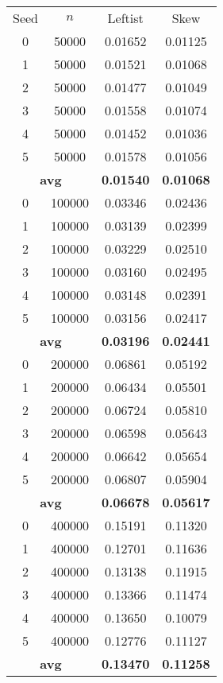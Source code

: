 \documentclass{article}
\begin{document}
\begin{minipage}{0.49\textwidth}
    \begin{center}
        \begin{tabular}{|cccc|}\hline
        Seed & $n$ & Leftist & Skew    \\
        0 &  50000 & 0.01652 & 0.01125 \\
        1 &  50000 & 0.01521 & 0.01068 \\
        2 &  50000 & 0.01477 & 0.01049 \\
        3 &  50000 & 0.01558 & 0.01074 \\
        4 &  50000 & 0.01452 & 0.01036 \\
        5 &  50000 & 0.01578 & 0.01056 \\
        \multicolumn{2}{|c}{\textbf{avg}} & \textbf{0.01540} & \textbf{0.01068} \\ \hline
        0 & 100000 & 0.03346 & 0.02436 \\
        1 & 100000 & 0.03139 & 0.02399 \\
        2 & 100000 & 0.03229 & 0.02510 \\
        3 & 100000 & 0.03160 & 0.02495 \\
        4 & 100000 & 0.03148 & 0.02391 \\
        5 & 100000 & 0.03156 & 0.02417 \\
        \multicolumn{2}{|c}{\textbf{avg}} & \textbf{0.03196} & \textbf{0.02441} \\ \hline
        0 & 200000 & 0.06861 & 0.05192 \\
        1 & 200000 & 0.06434 & 0.05501 \\
        2 & 200000 & 0.06724 & 0.05810 \\
        3 & 200000 & 0.06598 & 0.05643 \\
        4 & 200000 & 0.06642 & 0.05654 \\
        5 & 200000 & 0.06807 & 0.05904 \\
        \multicolumn{2}{|c}{\textbf{avg}} & \textbf{0.06678} & \textbf{0.05617} \\ \hline
        0 & 400000 & 0.15191 & 0.11320 \\
        1 & 400000 & 0.12701 & 0.11636 \\
        2 & 400000 & 0.13138 & 0.11915 \\
        3 & 400000 & 0.13366 & 0.11474 \\
        4 & 400000 & 0.13650 & 0.10079 \\
        5 & 400000 & 0.12776 & 0.11127 \\
        \multicolumn{2}{|c}{\textbf{avg}} & \textbf{0.13470} & \textbf{0.11258} \\ \hline
        \end{tabular}
        \label{tab:build}
    \end{center}
\end{minipage}
\end{document}
